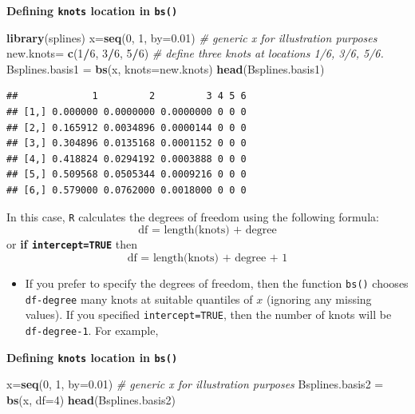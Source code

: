 \documentclass[
]{book}
\newenvironment{Shaded}{\begin{snugshade}}{\end{snugshade}}
\newcommand{\AttributeTok}[1]{\textcolor[rgb]{0.13,0.29,0.53}{#1}}
\newcommand{\CommentTok}[1]{\textcolor[rgb]{0.56,0.35,0.01}{\textit{#1}}}
\newcommand{\DecValTok}[1]{\textcolor[rgb]{0.00,0.00,0.81}{#1}}
\newcommand{\FloatTok}[1]{\textcolor[rgb]{0.00,0.00,0.81}{#1}}
\newcommand{\FunctionTok}[1]{\textcolor[rgb]{0.13,0.29,0.53}{\textbf{#1}}}
\newcommand{\NormalTok}[1]{#1}
\newcommand{\OtherTok}[1]{\textcolor[rgb]{0.56,0.35,0.01}{#1}}
\newcommand{\SpecialCharTok}[1]{\textcolor[rgb]{0.81,0.36,0.00}{\textbf{#1}}}
\providecommand{\tightlist}{%
  \setlength{\itemsep}{0pt}\setlength{\parskip}{0pt}}
\begin{document}
\textbf{Defining \texttt{knots} location in \texttt{bs()}}

\begin{Shaded}
\begin{Highlighting}[]
\FunctionTok{library}\NormalTok{(splines)}
\NormalTok{x}\OtherTok{=}\FunctionTok{seq}\NormalTok{(}\DecValTok{0}\NormalTok{, }\DecValTok{1}\NormalTok{, }\AttributeTok{by=}\FloatTok{0.01}\NormalTok{) }\CommentTok{\# generic \textasciigrave{}x\textasciigrave{} for illustration purposes}
\NormalTok{new.knots}\OtherTok{=} \FunctionTok{c}\NormalTok{(}\DecValTok{1}\SpecialCharTok{/}\DecValTok{6}\NormalTok{, }\DecValTok{3}\SpecialCharTok{/}\DecValTok{6}\NormalTok{, }\DecValTok{5}\SpecialCharTok{/}\DecValTok{6}\NormalTok{)  }\CommentTok{\# define three knots at locations 1/6, 3/6, 5/6.}
\NormalTok{Bsplines.basis1 }\OtherTok{=} \FunctionTok{bs}\NormalTok{(x, }\AttributeTok{knots=}\NormalTok{new.knots)}
\FunctionTok{head}\NormalTok{(Bsplines.basis1)}
\end{Highlighting}
\end{Shaded}

\begin{verbatim}
##             1         2         3 4 5 6
## [1,] 0.000000 0.0000000 0.0000000 0 0 0
## [2,] 0.165912 0.0034896 0.0000144 0 0 0
## [3,] 0.304896 0.0135168 0.0001152 0 0 0
## [4,] 0.418824 0.0294192 0.0003888 0 0 0
## [5,] 0.509568 0.0505344 0.0009216 0 0 0
## [6,] 0.579000 0.0762000 0.0018000 0 0 0
\end{verbatim}

In this case, \texttt{R} calculates the degrees of freedom using the following formula:
\[\text{df = length(knots) + degree}\]
or \textbf{if \texttt{intercept=TRUE}} then
\[\text{df = length(knots) + degree + 1}\]

\begin{itemize}
\tightlist
\item
  If you prefer to specify the degrees of freedom, then the function \texttt{bs()} chooses \texttt{df-degree} many knots at suitable quantiles of \(x\) (ignoring any missing values). If you specified \texttt{intercept=TRUE}, then the number of knots will be \texttt{df-degree-1}. For example,
\end{itemize}

\textbf{Defining \texttt{knots} location in \texttt{bs()}}

\begin{Shaded}
\begin{Highlighting}[]
\NormalTok{x}\OtherTok{=}\FunctionTok{seq}\NormalTok{(}\DecValTok{0}\NormalTok{, }\DecValTok{1}\NormalTok{, }\AttributeTok{by=}\FloatTok{0.01}\NormalTok{) }\CommentTok{\# generic \textasciigrave{}x\textasciigrave{} for illustration purposes}
\NormalTok{Bsplines.basis2 }\OtherTok{=} \FunctionTok{bs}\NormalTok{(x, }\AttributeTok{df=}\DecValTok{4}\NormalTok{)}
\FunctionTok{head}\NormalTok{(Bsplines.basis2)}
\end{Highlighting}
\end{Shaded}
\end{document}
